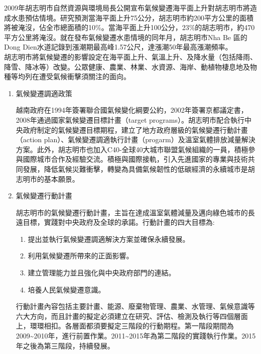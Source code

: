 \documentclass[a4paper,12pt]{article}
\begin{document}
\begin{enumerate}
\begin{enumerate}
2009年胡志明市自然資源與環境局長公開宣布氣候變遷海平面上升對胡志明市將造成水患預估情境。研究預測當海平面上升75公分，胡志明市約200平方公里的面積將被淹沒，佔全市總面積的10\%。當海平面上升100公分，23\%的胡志明市，約470平方公里將淹沒。就在發布氣候變遷水患情境的同年月，胡志明市Nha Be 區的Dong Dien水道記錄到漲潮期最高峰1.57公尺，達漲潮50年最高漲潮頻率。\\

胡志明市將氣候變遷的影響設定在海平面上升、氣溫上升、及降水量（包括降雨、降雪、降冰等）改變。公眾健康、農業、林業、水資源、海岸、動植物棲息地及物種等均列在遭受氣候衝擊須關注的面向。\\
\begin{enumerate}
\item 氣候變遷調適政策
\label{sec:orga120a74}

越南政府在1994年簽署聯合國氣候變化綱要公約，2002年簽署京都議定書，2008年通過國家氣候變遷目標計畫（target programs）。胡志明市配合執行中央政府制定的氣候變遷目標期程，建立了地方政府層級的氣候變遷行動計畫（action plan）、氣候變遷調適執行計畫（progarm）及溫室氣體排放減量解決方案。此外，胡志明市也加入C40-全球40大城市聯盟氣候組織的一員，積極參與國際城市合作及經驗交流。積極與國際接軌，引入先進國家的專業與技術共同發展，降低氣候災難衝擊，轉變為具備氣候韌性的低碳經濟的永續城市是胡志明市的基本願景。\\
\item 氣候變遷行動計畫
\label{sec:orgacd9565}

胡志明市的氣候變遷行動計畫，主旨在達成溫室氣體減量及邁向綠色城市的長遠目標，實踐對中央政府及全球的承諾。行動計畫的四大目標為:\\
\begin{enumerate}
\item 提出並執行氣候變遷調適解決方案並確保永續發展。\\
\item 利用氣候變遷所帶來的正面影響。\\
\item 建立管理能力並且強化與中央政府部門的連結。\\
\item 培養人民氣候變遷意識。\\
\end{enumerate}
行動計畫內容包括主要計畫、能源、廢棄物管理、農業、水管理、氣候意識等六大方向，而且計畫的擬定必須建立在研究、評估、檢測及執行等四個層面上，環環相扣。各層面都須要擬定三階段的行動期程。第一階段期間為2009\textasciitilde{}2010年，進行前置作業。2011\textasciitilde{}2015年為第二階段的實踐執行作業。2015年之後為第三階段，持續發展。\\


\end{enumerate}
\end{enumerate}
\end{enumerate}
\end{document}
